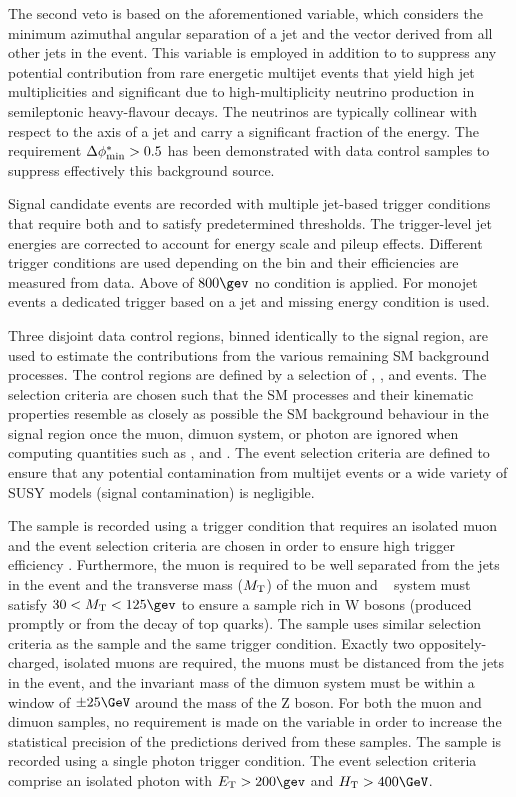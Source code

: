 The second veto is based on the aforementioned \dphi variable, which
considers the minimum azimuthal angular separation of a jet and the
\mht vector derived from all other jets in the event. This variable is
employed in addition to \alphat to suppress any potential contribution
from rare energetic multijet events that yield high jet multiplicities
and significant \met due to high-multiplicity neutrino production in
semileptonic heavy-flavour decays. The neutrinos are typically
collinear with respect to the axis of a jet and carry a significant
fraction of the energy. The requirement $\Delta\phi^{*}_{\rm min} > 0.5$ has been
demonstrated with data control samples to suppress effectively this
background source.

Signal candidate events are recorded with multiple jet-based trigger
conditions that require both \scalht and \alphat to satisfy
predetermined thresholds. The trigger-level jet energies are corrected
to account for energy scale and pileup effects. Different trigger
conditions are used depending on the \scalht bin and their
efficiencies are measured from data. Above \scalht of $800\gev$ no 
\alphat condition is applied. For monojet events a dedicated trigger based on a jet and missing energy condition is used.

Three disjoint data control regions, binned identically to the signal
region, are used to estimate the contributions from the various
remaining SM background processes. The control regions are defined by
a selection of \mj, \mmj, and \gj events. The selection criteria are
chosen such that the SM processes and their kinematic properties
resemble as closely as possible the SM background behaviour in the
signal region once the muon, dimuon system, or photon are ignored when
computing quantities such as \scalht, \mht and \alphat. 
The event selection criteria are defined to ensure that any potential
contamination from multijet events or a wide variety of SUSY models
(\ie signal contamination) is negligible.

The \mj sample is recorded using a trigger condition that requires an
isolated muon and the event selection criteria are chosen in order to ensure 
high trigger efficiency . Furthermore, the
muon is required to be well separated from the jets in the event and
the transverse mass ($M_{\rm T}$) of the muon and
\met~\cite{CMS-PAS-PFT-09-001, CMS-PAS-PFT-10-001} system must satisfy
$30 < M_{\rm T} < 125\gev$ to ensure a sample rich in W bosons
(produced promptly or from the decay of top quarks). The \mmj sample
uses similar selection criteria as the \mj sample and the same trigger
condition. Exactly two
oppositely-charged, isolated muons are required, the muons must be
distanced from the jets in the event, and the invariant mass of the
dimuon system must be within a window of $\pm 25\GeV$ around the mass
of the Z boson. For both the muon and dimuon samples, no requirement
is made on the variable \alphat in order to increase the statistical
precision of the predictions derived from these samples.  The \gj
sample is recorded using a single photon trigger condition. The event
selection criteria comprise an isolated photon with $\Et > 200\gev$ and
$\scalht > 400\GeV$.

